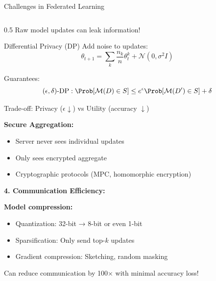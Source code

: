 \begin{frame}{Challenges in Federated Learning}
\begin{columns}
\begin{column}{0.5\textwidth}
Raw model updates can leak information!

\begin{block}{Differential Privacy (DP)}
Add noise to updates:
\[\theta_{t+1} = \sum_k \frac{n_k}{n} \theta_t^k + \mathcal{N}(0, \sigma^2 I)\]

Guarantees:
\[(\epsilon, \delta)\text{-DP}: \Prob[\mathcal{M}(D) \in S] \leq e^\epsilon \Prob[\mathcal{M}(D') \in S] + \delta\]

Trade-off: Privacy ($\epsilon \downarrow$) vs Utility (accuracy $\downarrow$)
\end{block}

\textbf{Secure Aggregation:}
\begin{itemize}
\item Server never sees individual updates
\item Only sees encrypted aggregate
\item Cryptographic protocols (MPC, homomorphic encryption)
\end{itemize}

\vspace{0.3cm}
\textbf{4. Communication Efficiency:}

\textbf{Model compression:}
\begin{itemize}
\item Quantization: 32-bit → 8-bit or even 1-bit
\item Sparsification: Only send top-$k$ updates
\item Gradient compression: Sketching, random masking
\end{itemize}

Can reduce communication by 100× with minimal accuracy loss!
\end{column}
\end{columns}
\end{frame}

